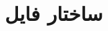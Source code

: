 {
    \protect\renewcommand\protect\cftchappresnum{\appendixname~}%
    \protect\setlength{\cftchapnumwidth}{\mylenapp}
}%
    
\chapter{ساختار فایل }\label{appendix:1}
\thispagestyle{empty}

